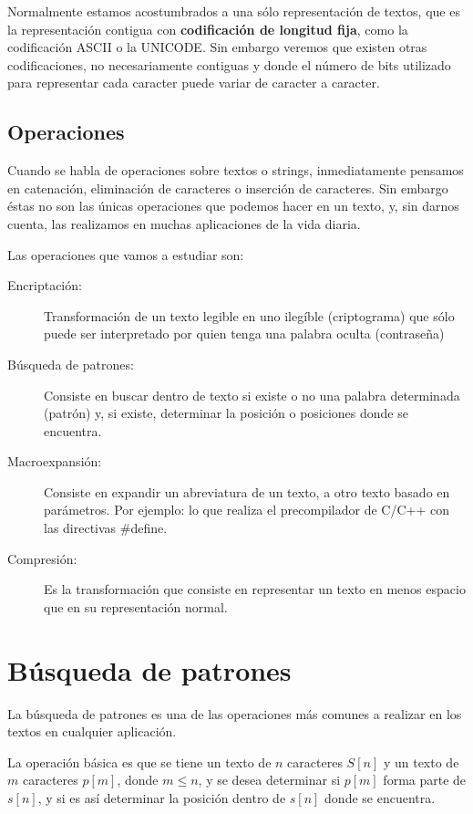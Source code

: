Normalmente estamos acostumbrados a una sólo representación de textos,
que es la representación contigua con \textbf{codificación de longitud
  fija}, como la codificación ASCII o la UNICODE.  Sin embargo veremos
que existen otras codificaciones, no necesariamente contiguas y donde
el número de bits utilizado para representar cada caracter puede
variar de caracter a caracter.

\subsection{Operaciones}
\label{sec:operaciones}

Cuando se habla de operaciones sobre textos o strings, inmediatamente
pensamos en catenación, eliminación de caracteres o inserción de
caracteres.  Sin embargo éstas no son las únicas operaciones que
podemos hacer en un texto, y, sin darnos cuenta, las realizamos en
muchas aplicaciones de la vida diaria.

Las operaciones que vamos a estudiar son:

\begin{description}
\item[Encriptación: ] Transformación de un texto legible en uno
  ilegíble (criptograma) que sólo puede ser interpretado por quien
  tenga una palabra oculta (contraseña)
\item[Búsqueda de patrones: ] Consiste en buscar dentro de texto si
  existe o no una palabra determinada (patrón) y, si existe,
  determinar la posición o posiciones donde se encuentra.
\item[Macroexpansión: ] Consiste en expandir un abreviatura de un
  texto, a otro texto basado en parámetros. Por ejemplo: lo que
  realiza el precompilador de C/C++ con las directivas \#define.
\item[Compresión: ] Es la transformación que consiste en representar
  un texto en menos espacio que en su representación normal.
\end{description}

\section{Búsqueda de patrones}
\label{sec:busqueda-de-patrones}

La búsqueda de patrones es una de las operaciones más comunes a
realizar en los textos en cualquier aplicación.

La operación básica es que se tiene un texto de $n$ caracteres $S[n]$
y un texto de $m$ caracteres $p[m]$, donde $m \leq n$, y se desea
determinar si $p[m]$ forma parte de $s[n]$, y si es así determinar la
posición dentro de $s[n]$ donde se encuentra.

